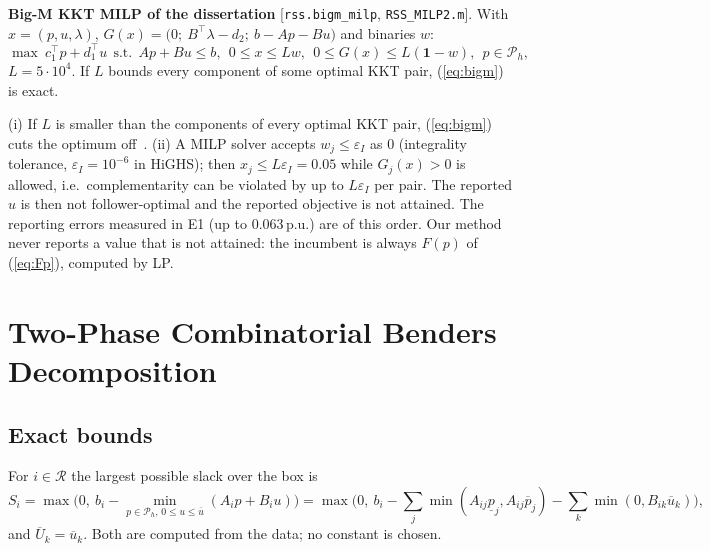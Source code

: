 \textbf{Big-M KKT MILP of the dissertation} [\texttt{rss.bigm\_milp}, \texttt{RSS\_MILP2.m}].
With $x=(p,u,\lambda)$, $G(x)=\big(0;\ B^\top\lambda-d_2;\ b-Ap-Bu\big)$ and binaries $w$:
\begin{equation}
\max\ c_1^\top p+d_1^\top u\ \ \text{s.t.}\ \ Ap+Bu\le b,\ \ 0\le x\le Lw,\ \ 0\le G(x)\le L(\mathbf 1-w),\ \ p\in\mathcal P_h,
\label{eq:bigm}
\end{equation}
$L=5\cdot10^4$. If $L$ bounds every component of some optimal KKT pair, (\ref{eq:bigm}) is exact.
\begin{remark}\label{rem:bigm}
(i) If $L$ is smaller than the components of every optimal KKT pair, (\ref{eq:bigm})
cuts the optimum off~\cite{pineda2019bigm}. (ii) A MILP solver accepts $w_j\le\varepsilon_I$ as
$0$ (integrality tolerance, $\varepsilon_I=10^{-6}$ in HiGHS); then $x_j\le L\varepsilon_I=0.05$
while $G_j(x)>0$ is allowed, i.e.\ complementarity can be violated by up to $L\varepsilon_I$
per pair. The reported $u$ is then not follower-optimal and the reported objective is
not attained. The reporting errors measured in E1 (up to 0.063\,p.u.) are of this order.
Our method never reports a value that is not attained: the incumbent is always
$F(p)$ of (\ref{eq:Fp}), computed by LP.
\end{remark}

\section{Two-Phase Combinatorial Benders Decomposition}
\label{app:benders}

\subsection{Exact bounds}
For $i\in\mathcal R$ the largest possible slack over the box is
\begin{equation}
S_i=\max\Big(0,\ b_i-\min_{p\in\mathcal P_h,\,0\le u\le\overline u}(A_ip+B_iu)\Big)
=\max\Big(0,\ b_i-\textstyle\sum_j\min(A_{ij}\underline p_j,A_{ij}\overline p_j)-\sum_k\min(0,B_{ik}\overline u_k)\Big),
\label{eq:S}
\end{equation}
and $\overline U_k=\overline u_k$. Both are computed from the data; no constant is chosen.

